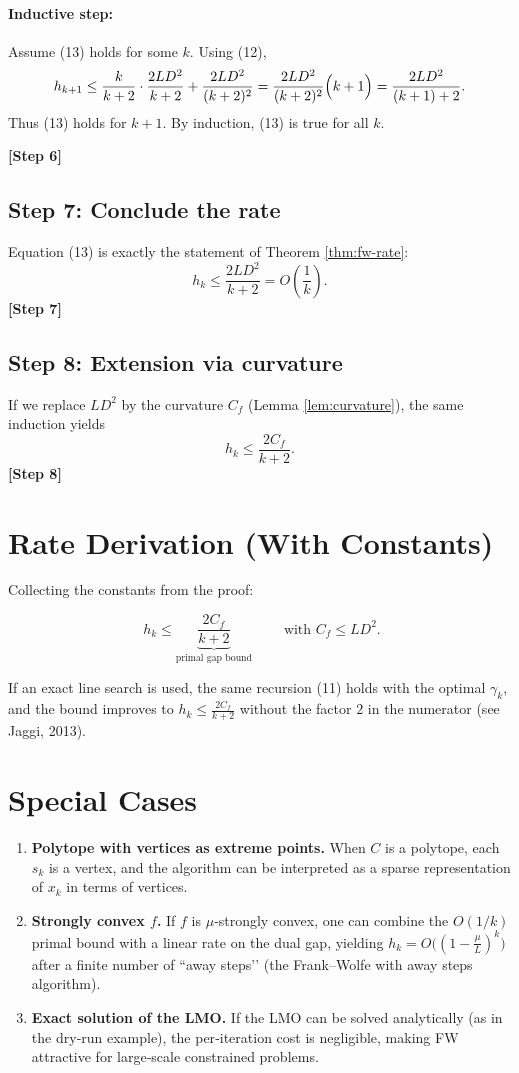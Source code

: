 \documentclass{article}
\begin{document}
\paragraph{Inductive step:}  
Assume (13) holds for some $k$. Using (12),
\[
h_{k+1}\le \frac{k}{k+2}\cdot\frac{2L D^{2}}{k+2}
      +\frac{2L D^{2}}{(k+2)^{2}}
      =\frac{2L D^{2}}{(k+2)^{2}}\Bigl(k+1\Bigr)
      =\frac{2L D^{2}}{(k+1)+2}.
\]
Thus (13) holds for $k+1$. By induction, (13) is true for all $k$.

\textbf{[Step 6]}

\subsection*{Step 7: Conclude the rate}
Equation (13) is exactly the statement of Theorem \ref{thm:fw-rate}:
\[
h_k \le \frac{2L D^{2}}{k+2}=O\!\left(\frac{1}{k}\right).
\]
\textbf{[Step 7]}

\subsection*{Step 8: Extension via curvature}
If we replace $L D^{2}$ by the curvature $C_f$ (Lemma \ref{lem:curvature}), the same induction yields
\[
h_k \le \frac{2C_f}{k+2}.
\tag{14}
\]
\textbf{[Step 8]}

\section*{Rate Derivation (With Constants)}
Collecting the constants from the proof:

\[
\boxed{\;h_k \le \underbrace{\frac{2C_f}{k+2}}_{\text{primal gap bound}}\;}
\qquad\text{with } C_f \le L D^{2}.
\]

If an exact line search is used, the same recursion (11) holds with the optimal
$\gamma_k$, and the bound improves to $h_k\le \frac{2C_f}{k+2}$ without the factor $2$ in the numerator (see Jaggi, 2013).

\section*{Special Cases}
\begin{enumerate}[label=\arabic*.]
\item \textbf{Polytope with vertices as extreme points.}  
When $C$ is a polytope, each $s_k$ is a vertex, and the algorithm can be interpreted as a sparse representation of $x_k$ in terms of vertices.
\item \textbf{Strongly convex $f$.}  
If $f$ is $\mu$‑strongly convex, one can combine the $O(1/k)$ primal bound with a linear rate on the dual gap, yielding $h_k = O\bigl((1-\frac{\mu}{L})^{k}\bigr)$ after a finite number of “away steps’’ (the Frank–Wolfe with away steps algorithm).
\item \textbf{Exact solution of the LMO.}  
If the LMO can be solved analytically (as in the dry‑run example), the per‑iteration cost is negligible, making FW attractive for large‑scale constrained problems.
\end{enumerate}
\end{document}

